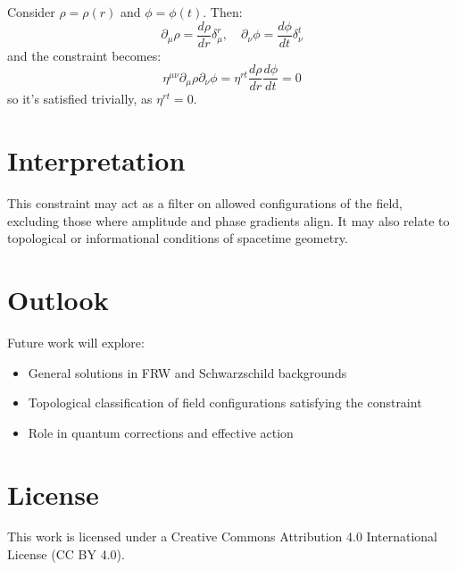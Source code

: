 \documentclass[12pt]{article}
\begin{document}
Consider $\rho = \rho(r)$ and $\phi = \phi(t)$. Then:
\[
\partial_\mu \rho = \frac{d\rho}{dr} \delta^r_\mu, \quad \partial_\nu \phi = \frac{d\phi}{dt} \delta^t_\nu
\]
and the constraint becomes:
\[
\eta^{\mu\nu} \partial_\mu \rho \partial_\nu \phi = \eta^{rt} \frac{d\rho}{dr} \frac{d\phi}{dt} = 0
\]
so it's satisfied trivially, as $\eta^{rt} = 0$.

\section{Interpretation}

This constraint may act as a filter on allowed configurations of the field, excluding those where amplitude and phase gradients align. It may also relate to topological or informational conditions of spacetime geometry.

\section{Outlook}

Future work will explore:
\begin{itemize}
  \item General solutions in FRW and Schwarzschild backgrounds
  \item Topological classification of field configurations satisfying the constraint
  \item Role in quantum corrections and effective action
\end{itemize}


\section*{License}
This work is licensed under a Creative Commons Attribution 4.0 International License (CC BY 4.0).
\end{document}
